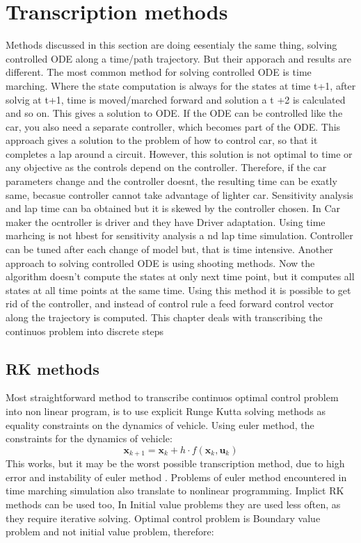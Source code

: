 \chapter{ Transcription methods}
Methods discussed in this section are doing eesentialy the same thing, solving controlled ODE along a time/path trajectory. But their apporach and results are different.
 The most common method for solving controlled ODE is time marching. Where the state computation is always for the states at time t+1, after solvig at t+1, time is moved/marched forward and solution a t +2 is calculated and so on. This gives a solution to ODE. If the ODE can be controlled like the car, you also need a separate controller, which becomes part of the ODE. This approach gives a solution to the problem of how to control car, so that it completes a lap around a circuit. However, this solution is not optimal to time or any objective as the controls depend on the controller. Therefore, if the car parameters change and the controller doesnt, the resulting time can be exatly same, becasue controller cannot take  advantage of lighter car. Sensitivity analysis and lap time can ba obtained but it is skewed by the controller chosen. In Car maker the ocntroller is driver and they have Driver adaptation. Using time marhcing is not hbest for sensitivity analysis a nd lap time simulation.
Controller can be tuned after each change of model but, that is time intensive. Another approach to solving controlled ODE is using shooting methods. Now the algorithm doesn't compute the states at only next time point, but it computes all states at all time points at the same time. Using this method it is possible to get rid of the controller, and instead of control rule a feed forward control vector along the trajectory is computed. This chapter deals with transcribing the continuos problem into discrete steps
\section{RK methods}
Most straightforward method to transcribe continuos optimal control problem into non linear program, is to use explicit Runge Kutta solving methods as equality constraints on the dynamics of vehicle. Using euler method, the constraints for the dynamics of vehicle:
\begin{equation}
	\mathbf{x}_{k+1} = \mathbf{x}_k + h \cdot f(\mathbf{x}_k, \mathbf{u}_k)
\end{equation}
This works, but it may be the worst possible transcription method, due to high error and instability of euler method \cite{SolvingOrdinaryDifferential1987}. Problems of euler method encountered in time marching simulation also translate to nonlinear programming. Implict RK methods can be used too, In Initial value problems they are used less often, as they require iterative solving. Optimal control problem is Boundary value problem and not initial value problem, therefore:

